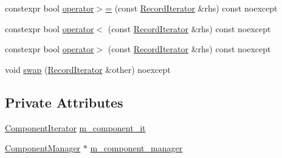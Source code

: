 \begin{DoxyCompactItemize}
\item 
constexpr bool \mbox{\hyperlink{classmage_1_1_component_manager_1_1_record_iterator_aff3cf2b140dd247425ebc84de18dbd24}{operator$>$=}} (const \mbox{\hyperlink{classmage_1_1_component_manager_1_1_record_iterator}{Record\+Iterator}} \&rhs) const noexcept
\item 
constexpr bool \mbox{\hyperlink{classmage_1_1_component_manager_1_1_record_iterator_a88678a49ca574b4f8173d1fc9e77b533}{operator$<$}} (const \mbox{\hyperlink{classmage_1_1_component_manager_1_1_record_iterator}{Record\+Iterator}} \&rhs) const noexcept
\item 
constexpr bool \mbox{\hyperlink{classmage_1_1_component_manager_1_1_record_iterator_aad75cd74dda035dc8bcbfb47470a40b1}{operator$>$}} (const \mbox{\hyperlink{classmage_1_1_component_manager_1_1_record_iterator}{Record\+Iterator}} \&rhs) const noexcept
\item 
void \mbox{\hyperlink{classmage_1_1_component_manager_1_1_record_iterator_afa0ecd310d2d665a8988f28dac3f2025}{swap}} (\mbox{\hyperlink{classmage_1_1_component_manager_1_1_record_iterator}{Record\+Iterator}} \&other) noexcept
\end{DoxyCompactItemize}
\subsection*{Private Attributes}
\begin{DoxyCompactItemize}
\item 
\mbox{\hyperlink{classmage_1_1_component_manager_1_1_record_iterator_aa9973dbab16d4cf276118634b8b43ece}{Component\+Iterator}} \mbox{\hyperlink{classmage_1_1_component_manager_1_1_record_iterator_ad69bc1019722bf4e48a146a3e31e1e30}{m\+\_\+component\+\_\+it}}
\item 
\mbox{\hyperlink{classmage_1_1_component_manager}{Component\+Manager}} $\ast$ \mbox{\hyperlink{classmage_1_1_component_manager_1_1_record_iterator_a150bfb56d4d0d1005bcb4aac75642d99}{m\+\_\+component\+\_\+manager}}
\end{DoxyCompactItemize}
